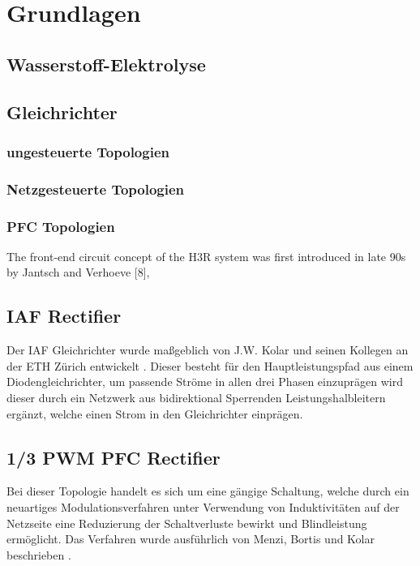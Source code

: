 \chapter{Grundlagen}


\section{Wasserstoff-Elektrolyse}

\section{Gleichrichter}

	\subsection{ungesteuerte Topologien}
	
	\subsection{Netzgesteuerte Topologien}
	
	\subsection{PFC Topologien}
	The front-end circuit concept of the H3R system was first introduced in late 90s by Jantsch and Verhoeve [8],
	
	
\section{IAF Rectifier}
Der \gls{IAF} Gleichrichter wurde maßgeblich von J.W. Kolar und seinen Kollegen an der ETH Zürich entwickelt \cite{IAFcontrol}. Dieser besteht für den Hauptleistungspfad aus einem Diodengleichrichter, um passende Ströme in allen drei Phasen einzuprägen wird dieser durch ein Netzwerk aus bidirektional Sperrenden Leistungshalbleitern ergänzt, welche einen Strom in den Gleichrichter einprägen.

\section{1/3 PWM PFC Rectifier}
Bei dieser Topologie handelt es sich um eine gängige Schaltung, welche durch ein neuartiges Modulationsverfahren unter Verwendung von Induktivitäten auf der Netzseite eine Reduzierung der Schaltverluste bewirkt und Blindleistung ermöglicht. Das Verfahren wurde ausführlich von Menzi, Bortis und Kolar beschrieben \cite{1/3PWMPFC}.
